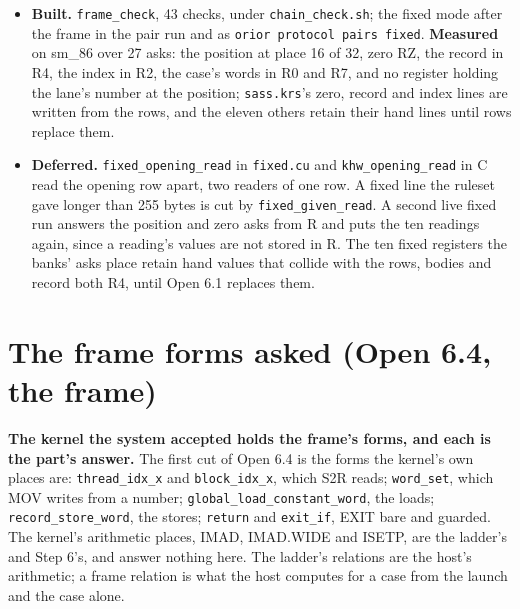 \begin{itemize}
\item \textbf{Built.} \texttt{frame\_\allowbreak{}check}, 43 checks, under \texttt{chain\_\allowbreak{}check.\allowbreak{}sh}; the fixed mode after the frame in the pair run and as \texttt{orior protocol pairs fixed}. \textbf{Measured} on sm\_\allowbreak{}86 over 27 asks: the position at place 16 of 32, zero RZ, the record in R4, the index in R2, the case's words in R0 and R7, and no register holding the lane's number at the position; \texttt{sass.\allowbreak{}krs}'s zero, record and index lines are written from the rows, and the eleven others retain their hand lines until rows replace them.
\item \textbf{Deferred.} \texttt{fixed\_\allowbreak{}opening\_\allowbreak{}read} in \texttt{fixed.\allowbreak{}cu} and \texttt{khw\_\allowbreak{}opening\_\allowbreak{}read} in C read the opening row apart, two readers of one row. A fixed line the ruleset gave longer than 255 bytes is cut by \texttt{fixed\_\allowbreak{}given\_\allowbreak{}read}. A second live fixed run answers the position and zero asks from R and puts the ten readings again, since a reading's values are not stored in R. The ten fixed registers the banks' asks place retain hand values that collide with the rows, bodies and record both R4, until Open 6.1 replaces them.
\end{itemize}

\section{\texorpdfstring{The frame forms asked (Open 6.4, the frame)}{The frame forms asked (Open 6.4, the frame)}}

\textbf{The kernel the system accepted holds the frame's forms, and each is the part's answer.} The first cut of Open 6.4 is the forms the kernel's own places are: \texttt{thread\_\allowbreak{}idx\_\allowbreak{}x} and \texttt{block\_\allowbreak{}idx\_\allowbreak{}x}, which S2R reads; \texttt{word\_\allowbreak{}set}, which MOV writes from a number; \texttt{global\_\allowbreak{}load\_\allowbreak{}constant\_\allowbreak{}word}, the loads; \texttt{record\_\allowbreak{}store\_\allowbreak{}word}, the stores; \texttt{return} and \texttt{exit\_\allowbreak{}if}, EXIT bare and guarded. The kernel's arithmetic places, IMAD, IMAD.WIDE and ISETP, are the ladder's and Step 6's, and answer nothing here. The ladder's relations are the host's arithmetic; a frame relation is what the host computes for a case from the launch and the case alone.

